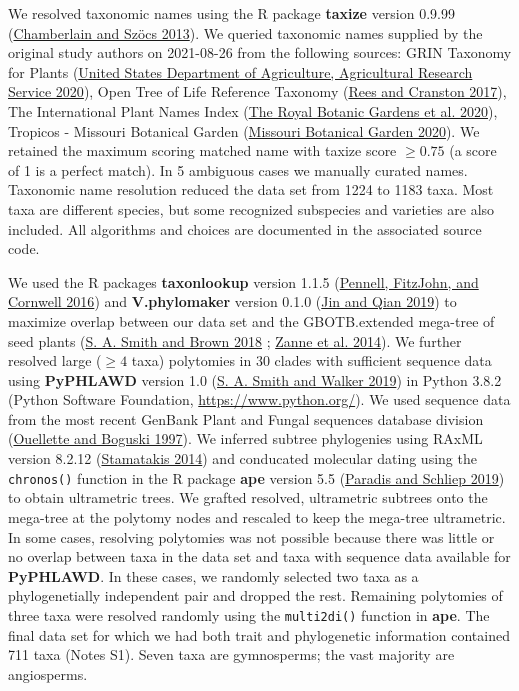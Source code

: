 \documentclass[
  10pt,
]{article}
\begin{document}
We resolved taxonomic names using the R package \textbf{taxize} version 0.9.99 (\protect\hyperlink{ref-chamberlain_taxize_2013}{Chamberlain and Szöcs 2013}). We queried taxonomic names supplied by the original study authors on 2021-08-26 from the following sources: GRIN Taxonomy for Plants (\protect\hyperlink{ref-united_states_department_of_agriculture_agricultural_research_service_germplasm_2020}{United States Department of Agriculture, Agricultural Research Service 2020}), Open Tree of Life Reference Taxonomy (\protect\hyperlink{ref-rees_automated_2017}{Rees and Cranston 2017}), The International Plant Names Index (\protect\hyperlink{ref-the_royal_botanic_gardens_international_2020}{The Royal Botanic Gardens et al. 2020}), Tropicos - Missouri Botanical Garden (\protect\hyperlink{ref-missouri_botanical_garden_tropicos_2020}{Missouri Botanical Garden 2020}). We retained the maximum scoring matched name with taxize score \(\ge 0.75\) (a score of 1 is a perfect match). In 5 ambiguous cases we manually curated names. Taxonomic name resolution reduced the data set from 1224 to 1183 taxa. Most taxa are different species, but some recognized subspecies and varieties are also included. All algorithms and choices are documented in the associated source code.

We used the R packages \textbf{taxonlookup} version 1.1.5 (\protect\hyperlink{ref-pennell_simple_2016}{Pennell, FitzJohn, and Cornwell 2016}) and \textbf{V.phylomaker} version 0.1.0 (\protect\hyperlink{ref-jin_vphylomaker_2019}{Jin and Qian 2019}) to maximize overlap between our data set and the GBOTB.extended mega-tree of seed plants (\protect\hyperlink{ref-smith_constructing_2018}{S. A. Smith and Brown 2018} ; \protect\hyperlink{ref-zanne_three_2014}{Zanne et al. 2014}). We further resolved large (\(\ge4\) taxa) polytomies in 30 clades with sufficient sequence data using \textbf{PyPHLAWD} version 1.0 (\protect\hyperlink{ref-smith_pyphlawd_2019}{S. A. Smith and Walker 2019}) in Python 3.8.2 (Python Software Foundation, \url{https://www.python.org/}). We used sequence data from the most recent GenBank Plant and Fungal sequences database division (\protect\hyperlink{ref-ouellette_database_1997}{Ouellette and Boguski 1997}). We inferred subtree phylogenies using RAxML version 8.2.12 (\protect\hyperlink{ref-stamatakis_raxml_2014}{Stamatakis 2014}) and conducated molecular dating using the \texttt{chronos()} function in the R package \textbf{ape} version 5.5 (\protect\hyperlink{ref-paradis_ape_2019}{Paradis and Schliep 2019}) to obtain ultrametric trees. We grafted resolved, ultrametric subtrees onto the mega-tree at the polytomy nodes and rescaled to keep the mega-tree ultrametric. In some cases, resolving polytomies was not possible because there was little or no overlap between taxa in the data set and taxa with sequence data available for \textbf{PyPHLAWD}. In these cases, we randomly selected two taxa as a phylogenetially independent pair and dropped the rest. Remaining polytomies of three taxa were resolved randomly using the \texttt{multi2di()} function in \textbf{ape}. The final data set for which we had both trait and phylogenetic information contained 711 taxa (Notes S1). Seven taxa are gymnosperms; the vast majority are angiosperms.
\end{document}

